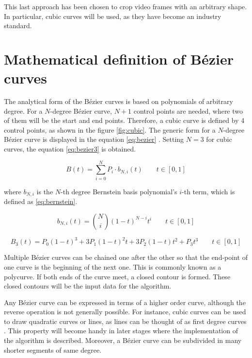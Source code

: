 \documentclass[\topdir/main.tex]{subfiles}
\begin{document}
This last approach has been chosen to crop video frames with an arbitrary shape. In particular, cubic curves will be used, as they have become an industry standard.

\section{Mathematical definition of Bézier curves}
The analytical form of the Bézier curves is based on polynomials of arbitrary degree. For a $N$-degree Bézier curve, $N+1$ control points are needed, where two of them will be the start and end points. Therefore, a cubic curve is defined by 4 control points, as shown in the figure \ref{fig:cubic}. The generic form for a $N$-degree Bézier curve is displayed in the equation \eqref{eq:bezier} \cite{pomax:bezier, wiki:bezier}. Setting $N=3$ for cubic curves, the equation \eqref{eq:bezier3} is obtained.\newline

\begin{equation} \label{eq:bezier}
    B(t) = \sum_{i = 0}^{N} P_i \cdot b_{N,i}(t) \qquad t \in [0, 1]
\end{equation}

where $b_{N,i}$ is the $N$-th degree Bernstein basis polynomial's $i$-th term, which is defined as \eqref{eq:bernstein}.\newline

\begin{equation} \label{eq:bernstein}
    b_{N,i}(t) = {N \choose i} (1-t)^{N-i} t^i \qquad t \in [0, 1]
\end{equation}

\begin{equation} \label{eq:bezier3}
    B_3(t) = P_0(1-t)^3 + 3P_1(1-t)^2t + 3P_2(1-t)t^2 + P_3t^3 \qquad t \in [0, 1]
\end{equation}

Multiple Bézier curves can be chained one after the other so that the end-point of one curve is the beginning of the next one. This is commonly known as a polycurve. If both ends of the curve meet, a closed contour is formed. These closed contours will be the input data for the algorithm.\newline 

Any Bézier curve can be expressed in terms of a higher order curve, although the reverse operation is not generally possible. For instance, cubic curves can be used to draw quadratic curves or lines, as lines can be thought of as first degree curves \cite{pomax:bezier}. This property will become handy in later stages where the implementation of the algorithm is described. Moreover, a Bézier curve can be subdivided in many shorter segments of same degree.\newline
\end{document}
